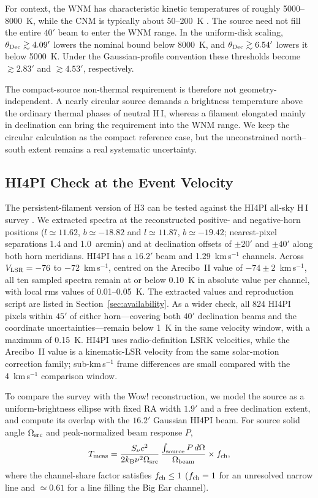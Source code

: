\documentclass[crop]{CSL}
\newcommand{\snu}{S_\nu}
\begin{document}
For context, the WNM has characteristic kinetic temperatures of roughly 5000--8000~K, while the CNM is typically about 50--200~K \citep{wolfire2003}. The source need not fill the entire $40'$ beam to enter the WNM range. In the uniform-disk scaling, $\theta_{\rm Dec}\gtrsim4.09'$ lowers the nominal bound below 8000~K, and $\theta_{\rm Dec}\gtrsim6.54'$ lowers it below 5000~K. Under the Gaussian-profile convention these thresholds become $\gtrsim2.83'$ and $\gtrsim4.53'$, respectively.

The compact-source non-thermal requirement is therefore not geometry-independent. A nearly circular source demands a brightness temperature above the ordinary thermal phases of neutral H\,I, whereas a filament elongated mainly in declination can bring the requirement into the WNM range. We keep the circular calculation as the compact reference case, but the unconstrained north--south extent remains a real systematic uncertainty.

\subsection{HI4PI Check at the Event Velocity}
\label{sec:hi4pi}

The persistent-filament version of H3 can be tested against the HI4PI all-sky H\,I survey \citep{hi4pi2016}. We extracted spectra at the reconstructed positive- and negative-horn positions ($l\simeq11.62$, $b\simeq-18.82$ and $l\simeq11.87$, $b\simeq-19.42$; nearest-pixel separations 1.4 and 1.0~arcmin) and at declination offsets of $\pm20'$ and $\pm40'$ along both horn meridians. HI4PI has a $16.2'$ beam and 1.29~km\,s$^{-1}$ channels. Across $V_{\rm LSR}=-76$ to $-72$~km\,s$^{-1}$, centred on the Arecibo~II value of $-74\pm2$~km\,s$^{-1}$, all ten sampled spectra remain at or below 0.10~K in absolute value per channel, with local rms values of 0.01--0.05~K. The extracted values and reproduction script are listed in Section~\ref{sec:availability}. As a wider check, all 824 HI4PI pixels within $45'$ of either horn---covering both $40'$ declination beams and the coordinate uncertainties---remain below 1~K in the same velocity window, with a maximum of 0.15~K. HI4PI uses radio-definition LSRK velocities, while the Arecibo~II value is a kinematic-LSR velocity from the same solar-motion correction family; sub-km\,s$^{-1}$ frame differences are small compared with the 4~km\,s$^{-1}$ comparison window.

To compare the survey with the Wow! reconstruction, we model the source as a uniform-brightness ellipse with fixed RA width $1.9'$ and a free declination extent, and compute its overlap with the $16.2'$ Gaussian HI4PI beam. For source solid angle $\Omega_{\rm src}$ and peak-normalized beam response $P$,
\begin{equation}
T_{\rm meas} =
\frac{\snu c^2}{2k_{\rm B}\nu^2\Omega_{\rm src}}\,
\frac{\int_{\rm source} P\,d\Omega}{\Omega_{\rm beam}}
\times f_{\rm ch},
\label{eq:hi4pi_coupling}
\end{equation}
where the channel-share factor satisfies $f_{\rm ch}\leq1$ ($f_{\rm ch}=1$ for an unresolved narrow line and $\simeq0.61$ for a line filling the Big Ear channel).
\end{document}
